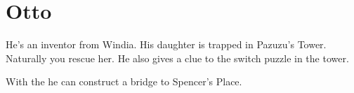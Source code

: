 \section{Otto}
\label{char:otto}


He’s an inventor from Windia. His daughter  is trapped in Pazuzu’s Tower. Naturally you rescue her. He also gives a clue to the switch puzzle in the tower.

\vspace{1em}

With the  he can construct a bridge to Spencer’s Place.


